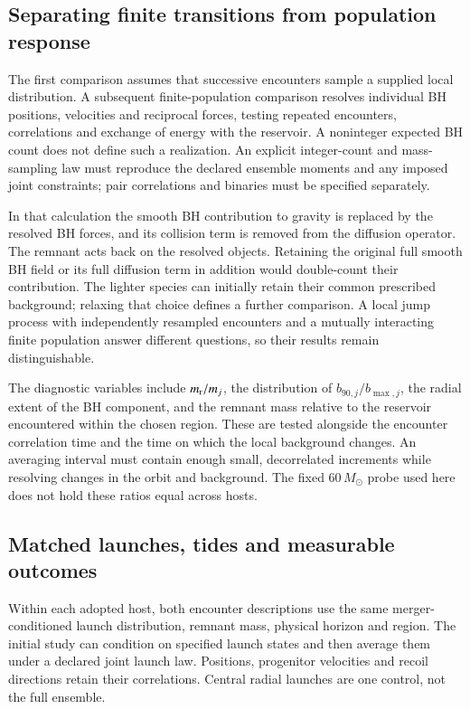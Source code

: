 \documentclass[aps,prd,reprint,amsmath,amssymb,superscriptaddress,nofootinbib,longbibliography,floatfix]{revtex4-2}
\begin{document}
\subsection{Separating finite transitions from population response}

The first comparison assumes that successive encounters sample a supplied local distribution. A subsequent finite-population comparison resolves individual BH positions, velocities and reciprocal forces, testing repeated encounters, correlations and exchange of energy with the reservoir. A noninteger expected BH count does not define such a realization. An explicit integer-count and mass-sampling law must reproduce the declared ensemble moments and any imposed joint constraints; pair correlations and binaries must be specified separately.

In that calculation the smooth BH contribution to gravity is replaced by the resolved BH forces, and its collision term is removed from the diffusion operator. The remnant acts back on the resolved objects. Retaining the original full smooth BH field or its full diffusion term in addition would double-count their contribution. The lighter species can initially retain their common prescribed background; relaxing that choice defines a further comparison. A local jump process with independently resampled encounters and a mutually interacting finite population answer different questions, so their results remain distinguishable.

The diagnostic variables include $m_{\rm r}/m_j$, the distribution of $b_{90,j}/b_{\max,j}$, the radial extent of the BH component, and the remnant mass relative to the reservoir encountered within the chosen region. These are tested alongside the encounter correlation time and the time on which the local background changes. An averaging interval must contain enough small, decorrelated increments while resolving changes in the orbit and background. The fixed $60\,M_\odot$ probe used here does not hold these ratios equal across hosts.

\subsection{Matched launches, tides and measurable outcomes}

Within each adopted host, both encounter descriptions use the same merger-conditioned launch distribution, remnant mass, physical horizon and region. The initial study can condition on specified launch states and then average them under a declared joint launch law. Positions, progenitor velocities and recoil directions retain their correlations. Central radial launches are one control, not the full ensemble.
\end{document}
